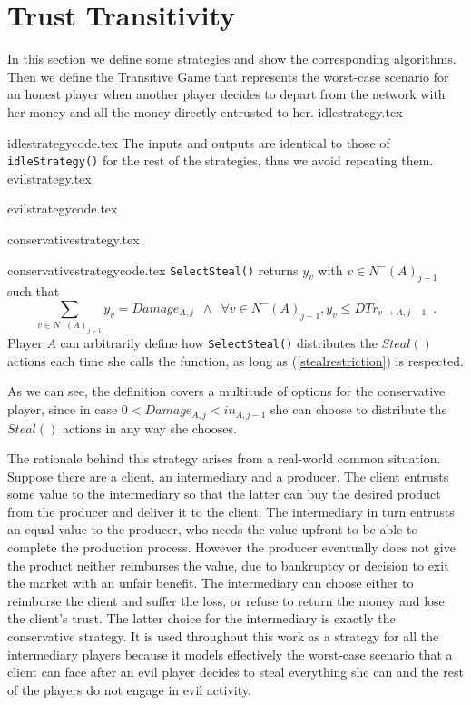 \section{Trust Transitivity}
  In this section we define some strategies and show the corresponding algorithms. Then we define the
  Transitive Game that represents the worst-case scenario for an honest player when another player decides to depart from
  the network with her money and all the money directly entrusted to her.
  {idlestrategy.tex}

  {idlestrategycode.tex}
  The inputs and outputs are identical to those of \texttt{idleStrategy()} for the rest of the strategies, thus we avoid
  repeating them.
  {evilstrategy.tex}

  {evilstrategycode.tex}

  {conservativestrategy.tex}

  {conservativestrategycode.tex}
  \texttt{SelectSteal()} returns $y_v$ with $v \in N^{-}\left(A\right)_{j-1}$ such that
  \begin{equation}
  \label{stealrestriction}
     \sum\limits_{v \in N^{-}\left(A\right)_{j-1}}y_v = Damage_{A, j} \enspace \wedge \enspace \forall v \in N^{-}\left(A\right)_{j-1},
     y_v \leq DTr_{v \rightarrow A, j-1} \enspace.
  \end{equation}
  Player $A$ can arbitrarily define how \texttt{SelectSteal()} distributes the $Steal\left(\right)$ actions
  each time she calls the function, as long as (\ref{stealrestriction}) is respected. 

  As we can see, the definition covers a multitude of options for the conservative player, since in case $0 < Damage_{A,j}
  < in_{A,j-1}$ she can choose to distribute the $Steal\left(\right)$ actions in any way she chooses.

  The rationale behind this strategy arises from a real-world common situation. Suppose there are a client, an
  intermediary and a producer. The client entrusts some value to the intermediary so that the latter can buy the desired
  product from the producer and deliver it to the client. The intermediary in turn entrusts an equal value to the
  producer, who needs the value upfront to be able to complete the production process. However the producer eventually
  does not give the product neither reimburses the value, due to bankruptcy or decision to exit the market with an unfair
  benefit. The intermediary can choose either to reimburse the client and suffer the loss, or refuse to return the money
  and lose the client's trust. The latter choice for the intermediary is exactly the conservative strategy. It is used
  throughout this work as a strategy for all the intermediary players because it models effectively the worst-case
  scenario that a client can face after an evil player decides to steal everything she can and the rest of the players do
  not engage in evil activity.

